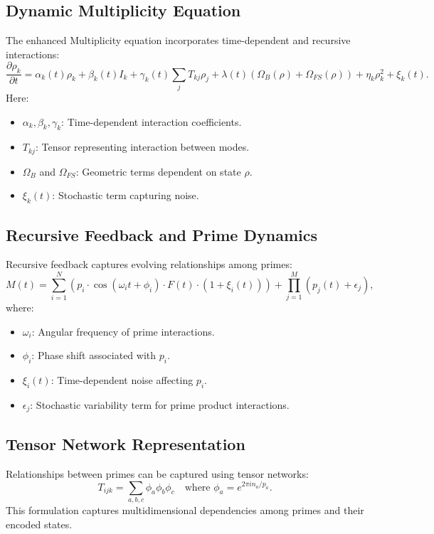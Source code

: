 \documentclass[11pt]{article}
\begin{document}
\subsection{Dynamic Multiplicity Equation}
The enhanced Multiplicity equation incorporates time-dependent and recursive interactions:
\begin{equation}
\frac{\partial \rho_k}{\partial t} = \alpha_k(t) \rho_k + \beta_k(t) I_k + \gamma_k(t) \sum_{j} T_{kj} \rho_j + \lambda(t) \left(\Omega_B(\rho) + \Omega_{FS}(\rho)\right) + \eta_k \rho_k^2 + \xi_k(t).
\end{equation}
Here:
\begin{itemize}
    \item $\alpha_k, \beta_k, \gamma_k$: Time-dependent interaction coefficients.
    \item $T_{kj}$: Tensor representing interaction between modes.
    \item $\Omega_B$ and $\Omega_{FS}$: Geometric terms dependent on state $\rho$.
    \item $\xi_k(t)$: Stochastic term capturing noise.
\end{itemize}

\subsection{Recursive Feedback and Prime Dynamics}
Recursive feedback captures evolving relationships among primes:
\begin{equation}
M(t) = \sum_{i=1}^N \left( p_i \cdot \cos(\omega_i t + \phi_i) \cdot F(t) \cdot \left(1 + \xi_i(t)\right) \right) + \prod_{j=1}^M \left(p_j(t) + \epsilon_j\right),
\end{equation}
where:
\begin{itemize}
    \item $\omega_i$: Angular frequency of prime interactions.
    \item $\phi_i$: Phase shift associated with $p_i$.
    \item $\xi_i(t)$: Time-dependent noise affecting $p_i$.
    \item $\epsilon_j$: Stochastic variability term for prime product interactions.
\end{itemize}

\subsection{Tensor Network Representation}
Relationships between primes can be captured using tensor networks:
\begin{equation}
T_{ijk} = \sum_{a,b,c} \phi_a \phi_b \phi_c \quad \text{where } \phi_a = e^{2\pi i n_a/p_a}.
\end{equation}
This formulation captures multidimensional dependencies among primes and their encoded states.
\end{document}
